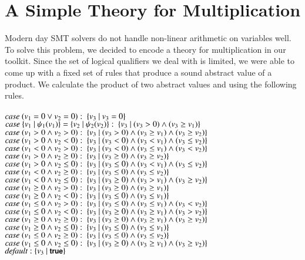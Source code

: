 \section{A Simple Theory for Multiplication}
Modern day SMT solvers do not handle non-linear arithmetic on variables well. To solve this problem, we decided to encode a theory for multiplication in our toolkit. Since the set of logical qualifiers we deal with is limited, we were able to come up with a fixed set of rules that produce a sound abstract value of a product. We calculate the product of two abstract values  and  using the following rules.\\\\
$\textit{case}\ (v_1 = 0 \logor v_2 = 0):\ \{v_3\ |\ v_3 = 0\}$\\
$\textit{case}\ \av{1}{1} = \av{2}{2}:\ \{v_3\ |\ (v_3 > 0) \logand (v_3 \ge v_1)\}$\\
$\textit{case}\ (v_1 > 0 \land v_2 > 0):\ \{v_3\ |\ (v_3 > 0) \land (v_3 \ge v_1) \land (v_3 \ge v_2)\}$\\
$\textit{case}\ (v_1 > 0 \land v_2 < 0):\ \{v_3\ |\ (v_3 < 0) \land (v_3 < v_1) \land (v_3 \le v_2)\}$\\
$\textit{case}\ (v_1 < 0 \land v_2 > 0):\ \{v_3\ |\ (v_3 < 0) \land (v_3 \le v_1) \land (v_3 < v_2)\}$\\
$\textit{case}\ (v_1 > 0 \land v_2 \ge 0):\ \{v_3\ |\ (v_3 \ge 0) \land (v_3 \ge v_2)\}$\\
$\textit{case}\ (v_1 > 0 \land v_2 \le 0):\ \{v_3\ |\ (v_3 \le 0) \land (v_3 < v_1) \land (v_3 \le v_2)\}$\\
$\textit{case}\ (v_1 < 0 \land v_2 \ge 0):\ \{v_3\ |\ (v_3 \le 0) \land (v_3 \le v_2)\}$\\
$\textit{case}\ (v_1 < 0 \land v_2 \le 0):\ \{v_3\ |\ (v_3 \ge 0) \land (v_3 > v_1) \land (v_3 \ge v_2)\}$\\
$\textit{case}\ (v_1 \ge 0 \land v_2 > 0):\ \{v_3\ |\ (v_3 \ge 0) \land (v_3 \ge v_1)\}$\\
$\textit{case}\ (v_1 \ge 0 \land v_2 < 0):\ \{v_3\ |\ (v_3 \le 0) \land (v_3 \le v_1)\}$\\
$\textit{case}\ (v_1 \le 0 \land v_2 > 0):\ \{v_3\ |\ (v_3 \le 0) \land (v_3 \le v_1) \land (v_3 < v_2)\}$\\
$\textit{case}\ (v_1 \le 0 \land v_2 < 0):\ \{v_3\ |\ (v_3 \ge 0) \land (v_3 \ge v_1) \land (v_3 > v_2)\}$\\
$\textit{case}\ (v_1 \ge 0 \land v_2 \ge 0):\ \{v_3\ |\ (v_3 \ge 0) \land (v_3 \ge v_1) \land (v_3 \ge v_2)\}$\\
$\textit{case}\ (v_1 \ge 0 \land v_2 \le 0):\ \{v_3\ |\ (v_3 \le 0) \land (v_3 \le v_1)\}$\\
$\textit{case}\ (v_1 \le 0 \land v_2 \ge 0):\ \{v_3\ |\ (v_3 \le 0) \land (v_3 \le v_2)\}$\\
$\textit{case}\ (v_1 \le 0 \land v_2 \le 0):\ \{v_3\ |\ (v_3 \ge 0) \land (v_3 \ge v_1) \land (v_3 \ge v_2)\}$\\
$\textit{default} : \{v_3\ |\ \true\}$